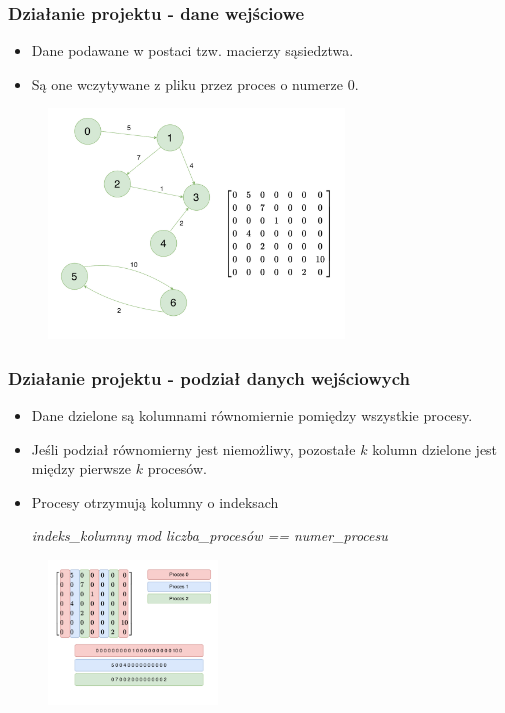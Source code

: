 \documentclass[10pt]{beamer}
\begin{document}
\begin{frame}
\frametitle{Działanie projektu - dane wejściowe}
\begin{itemize}
\item Dane podawane w postaci tzw. macierzy sąsiedztwa.
\item Są one wczytywane z pliku przez proces o numerze 0.
\end{itemize}
\begin{figure}
\centering
\includegraphics[width=0.7\textwidth]{static/Example.pdf}
\end{figure}

\end{frame}

\begin{frame}
\frametitle{Działanie projektu - podział danych wejściowych}
\begin{itemize}
\item Dane dzielone są kolumnami równomiernie pomiędzy wszystkie procesy. 
\item Jeśli podział równomierny jest niemożliwy, pozostałe $k$ kolumn dzielone jest między pierwsze $k$ procesów.
\item Procesy otrzymują kolumny o indeksach  \\ 
\begin{center} 
\textit{ indeks\_kolumny mod liczba\_procesów == numer\_procesu}
\end{center}

\end{itemize}
\begin{figure}
\centering
\includegraphics[width=0.4\textwidth]{static/MatrixChunks.pdf}
\end{figure}
\end{frame}
\end{document}
